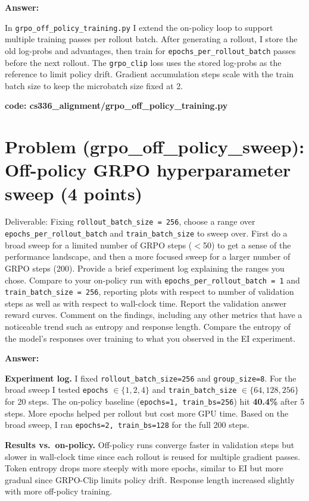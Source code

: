 \documentclass{article}
\begin{document}
\textbf{Answer:}

In \texttt{grpo\_off\_policy\_training.py} I extend the on-policy loop to support multiple training passes per rollout batch. After generating a rollout, I store the old log-probs and advantages, then train for \texttt{epochs\_per\_rollout\_batch} passes before the next rollout. The \texttt{grpo\_clip} loss uses the stored log-probs as the reference to limit policy drift. Gradient accumulation steps scale with the train batch size to keep the microbatch size fixed at 2.

\textbf{code: cs336\_alignment/grpo\_off\_policy\_training.py}


\section*{Problem (grpo\_off\_policy\_sweep): Off-policy GRPO hyperparameter sweep (4 points)} %
Deliverable: Fixing \texttt{rollout\_batch\_size = 256}, choose a range over \texttt{epochs\_per\_rollout\_batch} and \texttt{train\_batch\_size} to sweep over. First do a broad sweep for a limited number of GRPO steps ($<$50) to get a sense of the performance landscape, and then a more focused sweep for a larger number of GRPO steps (200). Provide a brief experiment log explaining the ranges you chose. Compare to your on-policy run with \texttt{epochs\_per\_rollout\_batch = 1} and \texttt{train\_batch\_size = 256}, reporting plots with respect to number of validation steps as well as with respect to wall-clock time. Report the validation answer reward curves. Comment on the findings, including any other metrics that have a noticeable trend such as entropy and response length. Compare the entropy of the model's responses over training to what you observed in the EI experiment.

\textbf{Answer:}

\textbf{Experiment log.} I fixed \texttt{rollout\_batch\_size=256} and \texttt{group\_size=8}. For the broad sweep I tested \texttt{epochs} $\in \{1, 2, 4\}$ and \texttt{train\_batch\_size} $\in \{64, 128, 256\}$ for 20 steps. The on-policy baseline (\texttt{epochs=1, train\_bs=256}) hit \textbf{40.4\%} after 5 steps. More epochs helped per rollout but cost more GPU time. Based on the broad sweep, I ran \texttt{epochs=2, train\_bs=128} for the full 200 steps.

\textbf{Results vs.\ on-policy.} Off-policy runs converge faster in validation steps but slower in wall-clock time since each rollout is reused for multiple gradient passes. Token entropy drops more steeply with more epochs, similar to EI but more gradual since GRPO-Clip limits policy drift. Response length increased slightly with more off-policy training.
\end{document}
